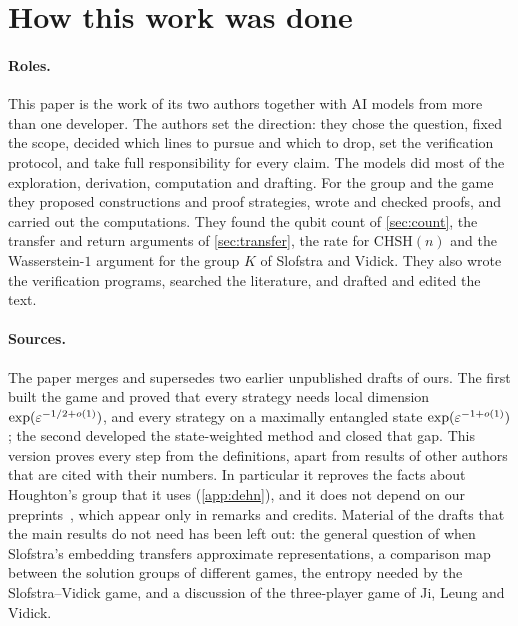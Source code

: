 \section*{How this work was done}

\paragraph{Roles.} This paper is the work of its two authors together with AI models from more than one developer. The authors set the
direction: they chose the question, fixed the scope, decided which lines to pursue and which to drop, set the verification protocol, and
take full responsibility for every claim. The models did most of the exploration, derivation, computation and drafting. For the group and the game
they proposed constructions and proof strategies, wrote and checked proofs, and carried out the computations. They found the qubit count
of \cref{sec:count}, the transfer and return arguments of \cref{sec:transfer}, the rate for CHSH$(n)$ and the Wasserstein-$1$ argument for
the group $K$ of Slofstra and Vidick. They also wrote the verification programs, searched the literature, and drafted and edited the
text.

\paragraph{Sources.} The paper merges and supersedes two earlier unpublished drafts of ours. The first built the game and proved that every strategy
needs local dimension $\exp(\varepsilon^{-1/2+o(1)})$, and every strategy on a maximally entangled state $\exp(\varepsilon^{-1+o(1)})$; the second
developed the state-weighted method and closed that gap. This version proves every step from the definitions, apart from results of other
authors that are cited with their numbers. In particular it reproves the facts about Houghton's group that it uses (\cref{app:dehn}), and
it does not depend on our preprints~\cite{DM-lamps,DM-H3}, which appear only in remarks and credits. Material of the drafts that the main
results do not need has been left out: the general question of when Slofstra's embedding transfers approximate representations, a
comparison map between the solution groups of different games, the entropy needed by the Slofstra--Vidick game, and a discussion of the
three-player game of Ji, Leung and Vidick.

